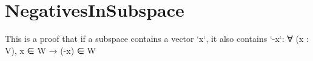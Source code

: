 \section{NegativesInSubspace}

\begin{theorem}
  \label{theorem : subspace_neg}
  \leanok
  This is a proof that if a subspace contains a vector `x`, it also contains `-x`: ∀ (x : V), x ∈ W → (-x) ∈ W
\end{theorem}
